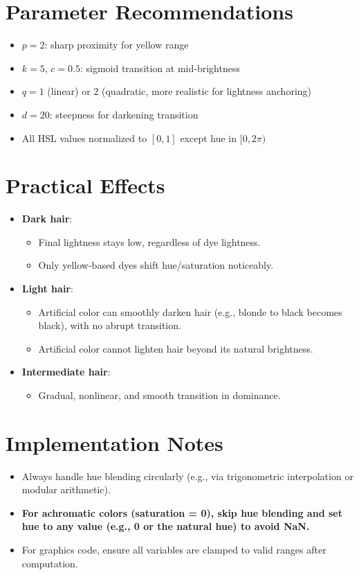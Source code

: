\documentclass[12pt]{article}
\begin{document}
\section*{Parameter Recommendations}
\begin{itemize}
    \item $p = 2$: sharp proximity for yellow range
    \item $k = 5$, $c = 0.5$: sigmoid transition at mid-brightness
    \item $q = 1$ (linear) or $2$ (quadratic, more realistic for lightness anchoring)
    \item $d = 20$: steepness for darkening transition
    \item All HSL values normalized to $[0,1]$ except hue in $[0, 2\pi)$
\end{itemize}

\section*{Practical Effects}
\begin{itemize}
    \item \textbf{Dark hair}:
    \begin{itemize}
        \item Final lightness stays low, regardless of dye lightness.
        \item Only yellow-based dyes shift hue/saturation noticeably.
    \end{itemize}
    \item \textbf{Light hair}:
    \begin{itemize}
        \item Artificial color can smoothly darken hair (e.g., blonde to black becomes black), with no abrupt transition.
        \item Artificial color cannot lighten hair beyond its natural brightness.
    \end{itemize}
    \item \textbf{Intermediate hair}:
    \begin{itemize}
        \item Gradual, nonlinear, and smooth transition in dominance.
    \end{itemize}
\end{itemize}

\section*{Implementation Notes}
\begin{itemize}
    \item Always handle hue blending circularly (e.g., via trigonometric interpolation or modular arithmetic).
    \item \textbf{For achromatic colors (saturation = 0), skip hue blending and set hue to any value (e.g., 0 or the natural hue) to avoid NaN.}
    \item For graphics code, ensure all variables are clamped to valid ranges after computation.
\end{itemize}
\end{document}
